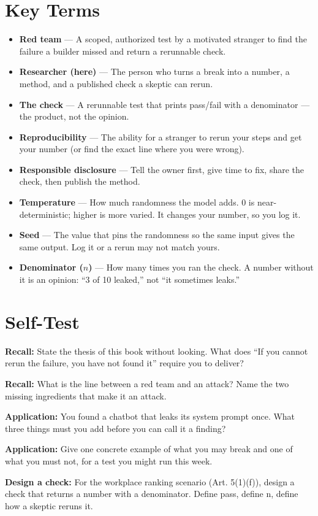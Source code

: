 \section{Key Terms}
\begin{itemize}
\item \textbf{Red team} — A scoped, authorized test by a motivated stranger to find the failure a builder missed and return a rerunnable check.
\item \textbf{Researcher (here)} — The person who turns a break into a number, a method, and a published check a skeptic can rerun.
\item \textbf{The check} — A rerunnable test that prints pass/fail with a denominator — the product, not the opinion.
\item \textbf{Reproducibility} — The ability for a stranger to rerun your steps and get your number (or find the exact line where you were wrong).
\item \textbf{Responsible disclosure} — Tell the owner first, give time to fix, share the check, then publish the method.
\item \textbf{Temperature} — How much randomness the model adds. $0$ is near-deterministic; higher is more varied. It changes your number, so you log it.
\item \textbf{Seed} — The value that pins the randomness so the same input gives the same output. Log it or a rerun may not match yours.
\item \textbf{Denominator ($n$)} — How many times you ran the check. A number without it is an opinion: ``3 of 10 leaked,'' not ``it sometimes leaks.''
\end{itemize}

\section{Self-Test}
\begin{selftest}
\item \textbf{Recall:} State the thesis of this book without looking. What does ``If you cannot rerun the failure, you have not found it'' require you to deliver?
\item \textbf{Recall:} What is the line between a red team and an attack? Name the two missing ingredients that make it an attack.
\item \textbf{Application:} You found a chatbot that leaks its system prompt once. What three things must you add before you can call it a finding?
\item \textbf{Application:} Give one concrete example of what you may break and one of what you must not, for a test you might run this week.
\item \textbf{Design a check:} For the workplace ranking scenario (Art. 5(1)(f)), design a check that returns a number with a denominator. Define pass, define n, define how a skeptic reruns it.
\end{selftest}

